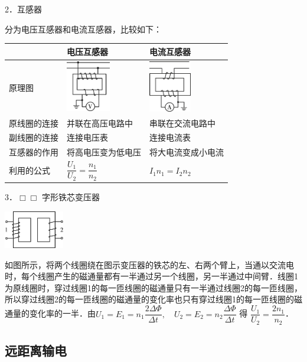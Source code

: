 \documentclass[cn,10.5pt,chinese,mac,chinesefont=founder]{elegantbook}
\begin{document}
2．互感器

分为电压互感器和电流互感器，比较如下：

\begin{longtable}[]{@{}m{2.2cm}m{4cm}m{4cm}@{}}
\toprule
& 电压互感器 & 电流互感器\tabularnewline
\midrule
\endhead
原理图 &
\includegraphics[width=0.76389in,height=0.87708in]{media/image458.png} &
\includegraphics[width=0.72639in,height=0.88681in]{media/image459.png}\tabularnewline
原线圈的连接 & 并联在高压电路中 & 串联在交流电路中\tabularnewline
副线圈的连接 & 连接电压表 & 连接电流表\tabularnewline
互感器的作用 & 将高电压变为低电压 & 将大电流变成小电流\tabularnewline
利用的公式 & $\dfrac{U_{1}}{U_{2}}=\dfrac{n_{1}}{n_{2}}$ & $I_{1} n_{1}=I_{2} n_{2}$\tabularnewline
\bottomrule
\end{longtable}




3．$\Box\Box$ 字形铁芯变压器
\begin{center}\includegraphics[width=1.02847in,height=0.65069in]{media/image461.png}\end{center}

如图所示，将两个线圈绕在图示变压器的铁芯的左、右两个臂上，当通以交流电时，每个线圈产生的磁通量都有一半通过另一个线圈，另一半通过中间臂．线圈1为原线圈时，穿过线圈1的每一匝线圈的磁通量只有一半通过线圈2的每一匝线圈，所以穿过线圈2的每一匝线圈的磁通量的变化率也只有穿过线圈1的每一匝线圈的磁通量的变化率的一半．由$U_1=E_1=n_{1} \dfrac{2 \Delta \Phi}{\Delta t}, \quad U_{2}=E_{2}=n_{2} \dfrac{\Delta \Phi}{\Delta t}$ 得 $\dfrac{U_{1}}{U_{2}}=\dfrac{2 n_{1}}{n_{2}}$．


\newpage
\subsection{远距离输电}
\end{document}
